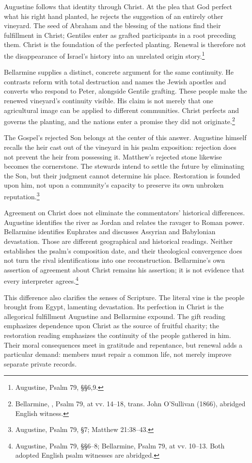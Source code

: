 Augustine follows that identity through Christ. At the plea that God perfect what his right hand planted, he rejects the suggestion of an entirely other vineyard. The seed of Abraham and the blessing of the nations find their fulfillment in Christ; Gentiles enter as grafted participants in a root preceding them. Christ is the foundation of the perfected planting. Renewal is therefore not the disappearance of Israel's history into an unrelated origin story.\footnote{Augustine, Psalm 79, §§6,9.}

Bellarmine supplies a distinct, concrete argument for the same continuity. He contrasts reform with total destruction and names the Jewish apostles and converts who respond to Peter, alongside Gentile grafting. These people make the renewed vineyard's continuity visible. His claim is not merely that one agricultural image can be applied to different communities. Christ perfects and governs the planting, and the nations enter a promise they did not originate.\footnote{Bellarmine, , Psalm 79, at vv. 14--18, trans. John O'Sullivan (1866), abridged English witness.}

The Gospel's rejected Son belongs at the center of this answer. Augustine himself recalls the heir cast out of the vineyard in his psalm exposition: rejection does not prevent the heir from possessing it. Matthew's rejected stone likewise becomes the cornerstone. The stewards intend to settle the future by eliminating the Son, but their judgment cannot determine his place. Restoration is founded upon him, not upon a community's capacity to preserve its own unbroken reputation.\footnote{Augustine, Psalm 79, §7; Matthew 21:38--43.}

Agreement on Christ does not eliminate the commentators' historical differences. Augustine identifies the river as Jordan and relates the ravager to Roman power. Bellarmine identifies Euphrates and discusses Assyrian and Babylonian devastation. Those are different geographical and historical readings. Neither establishes the psalm's composition date, and their theological convergence does not turn the rival identifications into one reconstruction. Bellarmine's own assertion of agreement about Christ remains his assertion; it is not evidence that every interpreter agrees.\footnote{Augustine, Psalm 79, §§6--8; Bellarmine, Psalm 79, at vv. 10--13. Both adopted English psalm witnesses are abridged.}

This difference also clarifies the senses of Scripture. The literal vine is the people brought from Egypt, lamenting devastation. Its perfection in Christ is the allegorical fulfillment Augustine and Bellarmine expound. The gift reading emphasizes dependence upon Christ as the source of fruitful charity; the restoration reading emphasizes the continuity of the people gathered in him. Their moral consequences meet in gratitude and repentance, but renewal adds a particular demand: members must repair a common life, not merely improve separate private records.

